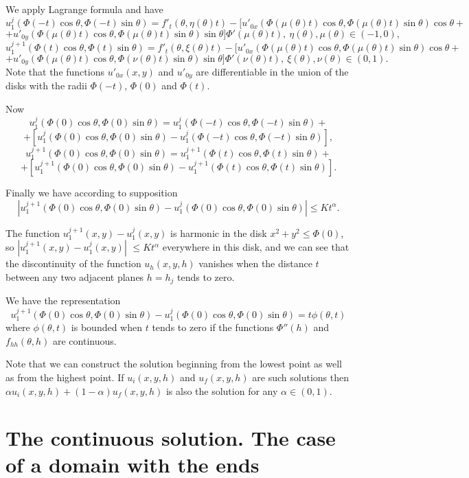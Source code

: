 \documentclass{amsart}
\begin{document}
We apply Lagrange formula and have
$$
u^j_1(\Phi(-t)\cos\theta,\Phi(-t)\sin\theta)=
f'_t(\theta,\eta(\theta) t)-[u'_{0 x}(\Phi(\mu(\theta) t)\cos\theta,
\Phi(\mu(\theta) t)\sin\theta) \cos\theta+
$$
$$
+u'_{0 y}(\Phi(\mu(\theta) t)\cos\theta, \Phi(\mu(\theta)
t)\sin\theta) \sin\theta] \Phi'(\mu(\theta) t),\
\eta(\theta),\mu(\theta)\in(-1,0),
$$
$$
u^{j+1}_1(\Phi(t)\cos\theta,\Phi(t)\sin\theta)=
f'_t(\theta,\xi(\theta) t)-[u'_{0 x}(\Phi(\mu(\theta) t)\cos\theta,
\Phi(\mu(\theta) t)\sin\theta) \cos\theta+
$$
$$
+u'_{0 y}(\Phi(\mu(\theta) t)\cos\theta, \Phi(\nu(\theta)
t)\sin\theta) \sin\theta] \Phi'(\nu(\theta) t),\
\xi(\theta),\nu(\theta)\in(0,1).
$$
Note that the functions $u'_{0 x}(x,y)$ and $u'_{0 y}$ are
differentiable in the union of the disks with the radii $\Phi(-t)$,
$\Phi(0)$ and $\Phi(t)$.

Now
$$
u^j_1(\Phi(0)\cos\theta,\Phi(0)\sin\theta)=u^j_1(\Phi(-t)\cos\theta,\Phi(-t)\sin\theta)+
$$
$$
+[u^j_1(\Phi(0)\cos\theta,\Phi(0)\sin\theta)-u^j_1(\Phi(-t)\cos\theta,\Phi(-t)\sin\theta)],
$$
$$
u^{j+1}_1(\Phi(0)\cos\theta,\Phi(0)\sin\theta)=u^{j+1}_1(\Phi(t)\cos\theta,\Phi(t)\sin\theta)+
$$
$$
+[u^{j+1}_1(\Phi(0)\cos\theta,\Phi(0)\sin\theta)-u^{j+1}_1(\Phi(t)\cos\theta,\Phi(t)\sin\theta)].
$$

Finally we have according to supposition
$$
|u^{j+1}_1(\Phi(0)\cos\theta,\Phi(0)\sin\theta)-u^j_1(\Phi(0)\cos\theta,\Phi(0)\sin\theta)|\leq
K t^{\alpha}.
$$

The function $u^{j+1}_1(x,y)-u^{j}_1(x,y)$ is harmonic in the disk
$x^2+y^2\leq \Phi(0)$, so $|u^{j+1}_1(x,y)-u^{j}_1(x,y)|$ $\leq K
t^{\alpha}$ everywhere in this disk, and we can see that the
discontinuity of the function $u_h(x,y,h)$ vanishes when the
distance $t$ between any two adjacent planes $h=h_j$ tends to zero.

We have the representation
$$
u^{j+1}_1(\Phi(0)\cos\theta,\Phi(0)\sin\theta)-u^j_1(\Phi(0)\cos\theta,\Phi(0)\sin\theta)=
t \phi(\theta,t)
$$
where $\phi(\theta,t)$ is bounded when $t$ tends to zero if the
functions $\Phi''(h)$ and $f_{hh}(\theta,h)$ are continuous.

Note that we can construct the solution beginning from the lowest
point as well as from the highest point. If $u_i(x,y,h)$ and
$u_f(x,y,h)$ are such solutions then $\alpha u_i(x,y,h)+(1-\alpha)
u_f(x,y,h)$ is also the solution for any $\alpha \in(0,1)$.



\section{The continuous solution. The case of a domain with the ends}
\end{document}
